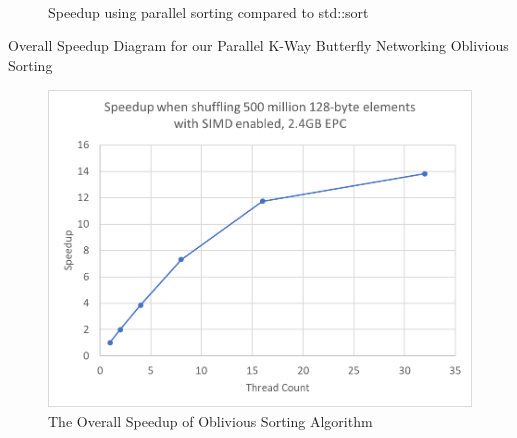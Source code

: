 \documentclass[final,hyperref={pdfpagelabels=false}]{beamer}
\begin{document}
\begin{frame}
\begin{columns}[t]
\begin{column}{.30\linewidth}
\begin{figure}[h]
\begin{minipage}{0.48\linewidth}
            \caption{Speedup using parallel sorting compared to std::sort}
        \end{minipage} \\ \\  \\
    \end{figure}
    \vspace{50}
    \begin{block}{Overall Speedup Diagram for our Parallel K-Way Butterfly Networking Oblivious Sorting}
    \end{block}
    \begin{figure}
      \includegraphics[width=0.8\linewidth]{assets/speedup_shuffle.png}
      \caption{The Overall Speedup of Oblivious Sorting Algorithm}
    \end{figure}

  \end{column}
  


\end{columns}
\end{frame}
\end{document}
